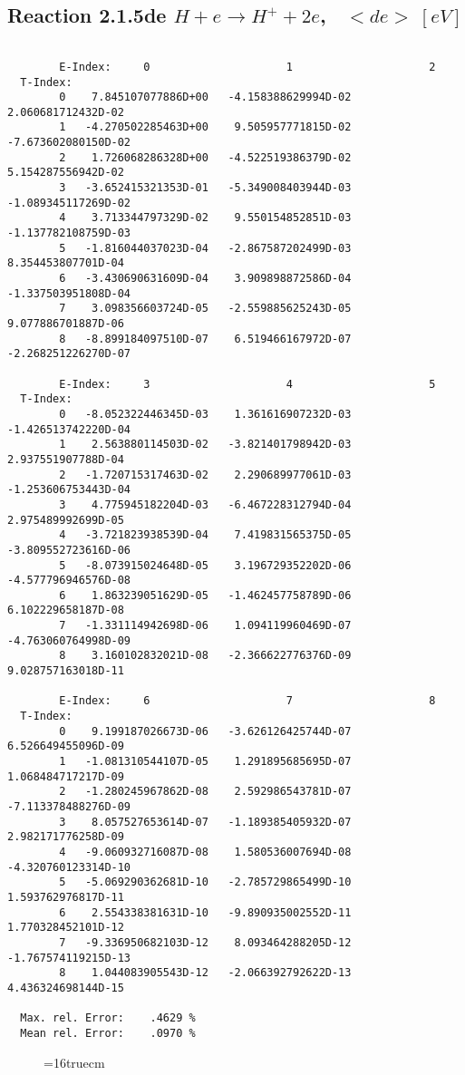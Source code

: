 \documentclass[12pt,dvipdfmx]{article}
\begin{document}
\newpage

\subsection{
Reaction 2.1.5de  $ H + e \rightarrow H^+ + 2e$, \   $<de> \ [eV]$}


\begin{small}\begin{verbatim}

        E-Index:     0                     1                     2
  T-Index:
        0    7.845107077886D+00   -4.158388629994D-02    2.060681712432D-02
        1   -4.270502285463D+00    9.505957771815D-02   -7.673602080150D-02
        2    1.726068286328D+00   -4.522519386379D-02    5.154287556942D-02
        3   -3.652415321353D-01   -5.349008403944D-03   -1.089345117269D-02
        4    3.713344797329D-02    9.550154852851D-03   -1.137782108759D-03
        5   -1.816044037023D-04   -2.867587202499D-03    8.354453807701D-04
        6   -3.430690631609D-04    3.909898872586D-04   -1.337503951808D-04
        7    3.098356603724D-05   -2.559885625243D-05    9.077886701887D-06
        8   -8.899184097510D-07    6.519466167972D-07   -2.268251226270D-07

        E-Index:     3                     4                     5
  T-Index:
        0   -8.052322446345D-03    1.361616907232D-03   -1.426513742220D-04
        1    2.563880114503D-02   -3.821401798942D-03    2.937551907788D-04
        2   -1.720715317463D-02    2.290689977061D-03   -1.253606753443D-04
        3    4.775945182204D-03   -6.467228312794D-04    2.975489992699D-05
        4   -3.721823938539D-04    7.419831565375D-05   -3.809552723616D-06
        5   -8.073915024648D-05    3.196729352202D-06   -4.577796946576D-08
        6    1.863239051629D-05   -1.462457758789D-06    6.102229658187D-08
        7   -1.331114942698D-06    1.094119960469D-07   -4.763060764998D-09
        8    3.160102832021D-08   -2.366622776376D-09    9.028757163018D-11

        E-Index:     6                     7                     8
  T-Index:
        0    9.199187026673D-06   -3.626126425744D-07    6.526649455096D-09
        1   -1.081310544107D-05    1.291895685695D-07    1.068484717217D-09
        2   -1.280245967862D-08    2.592986543781D-07   -7.113378488276D-09
        3    8.057527653614D-07   -1.189385405932D-07    2.982171776258D-09
        4   -9.060932716087D-08    1.580536007694D-08   -4.320760123314D-10
        5   -5.069290362681D-10   -2.785729865499D-10    1.593762976817D-11
        6    2.554338381631D-10   -9.890935002552D-11    1.770328452101D-12
        7   -9.336950682103D-12    8.093464288205D-12   -1.767574119215D-13
        8    1.044083905543D-12   -2.066392792622D-13    4.436324698144D-15

  Max. rel. Error:    .4629 %
  Mean rel. Error:    .0970 %

\end{verbatim}\end{small}
\begin{figure} \label{2.1.5li2}
\epsfxsize=16truecm
\end{figure}
\newpage
\end{document}
